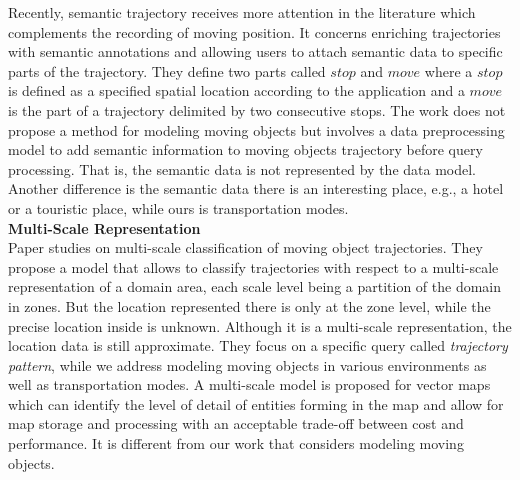 Recently, semantic trajectory \cite{ABKMMV07,SPDMPV08,BKA09} receives more attention in the 
literature which complements the recording of moving position. It concerns enriching
trajectories with semantic annotations and allowing users to attach semantic data 
to specific parts of the trajectory. They define two parts called $stop$ and $move$ where a $stop$ is defined as a specified spatial location according to the application and a $move$ is the part of a 
trajectory delimited by two consecutive stops. The work does not propose a method for modeling 
moving objects but involves a data preprocessing model to add semantic information to 
moving objects trajectory before query processing. 
That is, the semantic data is not represented by the data model. 
Another difference is the semantic data there is an interesting 
place, e.g., a hotel or a touristic place, while ours is transportation modes. \\

\textbf{Multi-Scale Representation} \\

Paper \cite{MR04} studies on multi-scale classification of moving object trajectories. 
They propose a model that allows to classify trajectories with respect to a multi-scale
representation of a domain area, each scale level being a partition of the domain in zones. 
But the location represented there is only at the zone level, while the precise location
inside is unknown. Although it is a multi-scale representation, the location data is still
approximate. They focus on a specific query called \textit{trajectory pattern}, 
while we address modeling moving objects in various environments as well as transportation modes. A multi-scale model \cite{VMPR06} is proposed for vector maps which can identify the level of detail of entities forming in the map and allow for map storage and processing with an acceptable trade-off between cost and performance. It is different from our work that considers modeling moving objects. 
